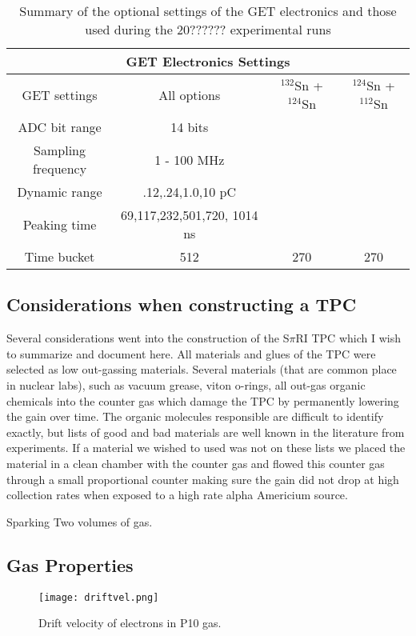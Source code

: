\begin{table}
 \begin{tabular}{||c c c c||} 
 \hline
 \multicolumn{4}{|c|}{GET Electronics Settings} \\
 \hline
 GET settings & All options & ${}^{132}$Sn + ${}^{124}$Sn & ${}^{124}$Sn + ${}^{112}$Sn \\
 \hline
 ADC bit range      & 14 bits &  &  \\
 \hline
 Sampling frequency & 1 - 100 MHz &   &    \\
 \hline
 Dynamic range      & .12,.24,1.0,10 pC & & \\
 \hline
 Peaking time       &  69,117,232,501,720, 1014 ns &  &   \\
 \hline
 Time bucket        & 512 & 270 & 270  \\
 \hline
\end{tabular}
\caption{Summary of the optional settings of the GET electronics and those used during the 20?????? experimental runs}
\label{tb:getoverview}
\end{table}

\subsection{Considerations when constructing a TPC}
Several considerations went into the construction of the S$\pi$RI TPC which I wish to summarize and document here. All materials and glues of the TPC were selected as low out-gassing materials. Several materials (that are common place in nuclear labs), such as vacuum grease, viton o-rings, all out-gas organic chemicals into the counter gas which damage the TPC by permanently lowering the gain over time. The organic molecules responsible are difficult to identify exactly, but lists of good and bad materials are well known in the literature from experiments. If a material we wished to used was not on these lists we placed the material in a clean chamber with the counter gas and flowed this counter gas through a small proportional counter making sure the gain did not drop at high collection rates when exposed to a high rate alpha Americium source. 

Sparking
Two volumes of gas. 


\subsection{Gas Properties}

\begin{figure}[H]
\texttt{[image: driftvel.png]}
\caption{Drift velocity of electrons in P10 gas.}
\label{fig:driftvel}
\end{figure}

